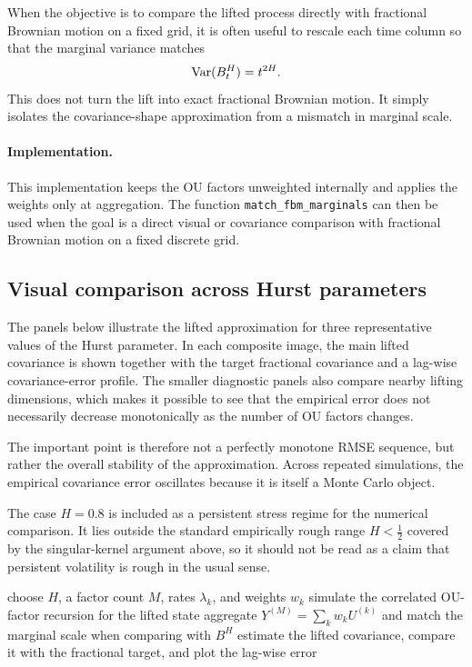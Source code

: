 When the objective is to compare the lifted process directly with fractional Brownian motion on a fixed grid, it is often useful to rescale each time column so that the marginal variance matches
\[
\operatorname{Var}(B_t^H)=t^{2H}.
\]
This does not turn the lift into exact fractional Brownian motion. It simply isolates the covariance-shape approximation from a mismatch in marginal scale.

\paragraph{Implementation.}

This implementation keeps the OU factors unweighted internally and applies the weights only at aggregation. The function \texttt{match\_fbm\_marginals} can then be used when the goal is a direct visual or covariance comparison with fractional Brownian motion on a fixed discrete grid.

\subsection{Visual comparison across Hurst parameters}

The panels below illustrate the lifted approximation for three representative values of the Hurst parameter. In each composite image, the main lifted covariance is shown together with the target fractional covariance and a lag-wise covariance-error profile. The smaller diagnostic panels also compare nearby lifting dimensions, which makes it possible to see that the empirical error does not necessarily decrease monotonically as the number of OU factors changes.

The important point is therefore not a perfectly monotone RMSE sequence, but rather the overall stability of the approximation. Across repeated simulations, the empirical covariance error oscillates because it is itself a Monte Carlo object. 

The case $H=0.8$ is included as a persistent stress regime for the numerical comparison. It lies outside the standard empirically rough range $H<\tfrac12$ covered by the singular-kernel argument above, so it should not be read as a claim that persistent volatility is rough in the usual sense.

\begin{algorithm}[H]
\caption{Reading the Markovian-lifting diagnostic panels}
\DontPrintSemicolon
choose \(H\), a factor count \(M\), rates \(\lambda_k\), and weights \(w_k\)\;
simulate the correlated OU-factor recursion for the lifted state\;
aggregate \(Y^{(M)}=\sum_k w_k U^{(k)}\) and match the marginal scale when comparing with \(B^H\)\;
estimate the lifted covariance, compare it with the fractional target, and plot the lag-wise error\;
\end{algorithm}

